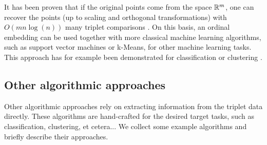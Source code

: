 It has been proven that if the original points come from the space $\mathbb{R}^{m}$, one can recover the points (up to scaling and orthogonal transformations) with $O(mn\log(n))$ many triplet comparisons
\citep{jainFiniteSamplePrediction2016}. On this basis, an ordinal embedding can be used together with more classical machine learning algorithms, such as support vector machines or k-Means,
for other machine learning tasks. This approach has for example been demonstrated for classification \citep{tamuzAdaptivelyLearningCrowd2011, kleindessnerLensDepthFunction2017} or clustering \citep{kleindessnerLensDepthFunction2017}.

\subsection{Other algorithmic approaches}
Other algorithmic approaches rely on extracting information from the triplet data directly.
These algorithms are hand-crafted for the desired target tasks, such as classification, clustering, et cetera... We collect some example algorithms and briefly describe their approaches.

